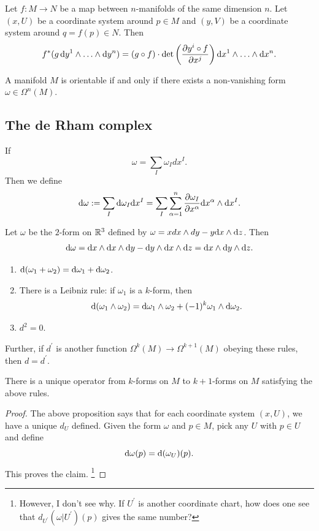 \documentclass[11pt, english]{article}
\begin{document}
\begin{thm}
 Let $f:M \to N$ be a map between $n$-manifolds of the same dimension $n$. Let $(x,U)$ be a coordinate system around $p \in M$ and $(y,V)$ be a coordinate system around $q=f(p) \in N$. Then
\[
f^\ast(g\,  \mathrm{d}{y}^1 \wedge \ldots \wedge \mathrm{d}{y}^n) = (g \circ f) \cdot \det \left( \frac{\partial {y^i \circ f}}{\partial {x^j}} \right) \mathrm{d}{x}^1 \wedge \ldots \wedge \mathrm{d}{x}^n.
\]
\end{thm}

\begin{thm}
 A manifold $M$ is orientable if and only if there exists a non-vanishing form $\omega \in \Omega^n(M)$. 
\end{thm}

\subsection{The de Rham complex}
If
\[
\omega = \sum_I \omega_I dx^I.
\]
Then we define
\[
\mathrm{d}{\omega} := \sum_I \mathrm{d}{\omega} _I \mathrm{d}{x}^I = \sum_I \sum_{\alpha=1}^n \frac{\partial {\omega_I}}{\partial {x^\alpha}} \mathrm{d}{x}^\alpha \wedge \mathrm{d}{x}^I .
\]

\begin{example}
Let $\omega$ be the $2$-form on $\mathbb{R}^3$ defined by $\omega = x dx \wedge dy -y \mathrm{d}{x} \wedge \mathrm{d}{z}$. Then
\[
\mathrm{d}{\omega} = \mathrm{d}{x} \wedge \mathrm{d}{x} \wedge \mathrm{d}{y} - \mathrm{d}{y} \wedge \mathrm{d}{x} \wedge \mathrm{d}{z} = \mathrm{d}{x} \wedge \mathrm{d}{y} \wedge \mathrm{d}{z}.
\]
\end{example}

\begin{prop}
\begin{enumerate}
\item $\mathrm{d}{(}\omega_1 + \omega_ 2 ) = \mathrm{d}{\omega}_1 + \mathrm{d}{\omega}_2$.
\item There is a Leibniz rule: if $\omega_1$ is a $k$-form, then
\[
\mathrm{d}{(}\omega_1 \wedge \omega_2) = \mathrm{d}{\omega}_1 \wedge \omega_2 + (-1)^k \omega_1 \wedge \mathrm{d}{\omega}_2.
\]
\item $d^2=0$.
\end{enumerate}
Further, if $d^\prime$ is another function $\Omega^k(M) \to \Omega^{k+1}(M)$ obeying these rules, then $d=d^\prime$. 
\end{prop}

\begin{corr}
There is a unique operator from $k$-forms on $M$ to $k+1$-forms on $M$ satisfying the above rules.
\end{corr}
\begin{proof}
The above proposition says that for each coordinate system $(x,U)$, we have a unique $d_U$ defined. Given the form $\omega$ and $p \in M$, pick any $U$ with $p \in U$ and define
\[
\mathrm{d}{\omega}(p) = \mathrm{d}{(}\omega_{U})(p).
\]
This proves the claim. \footnote{However, I don't see why. If $U^\prime$ is another coordinate chart, how does one see that $d_{U^\prime}(\omega |U^\prime)(p)$ gives the same number?}

\end{proof}
\end{document}
